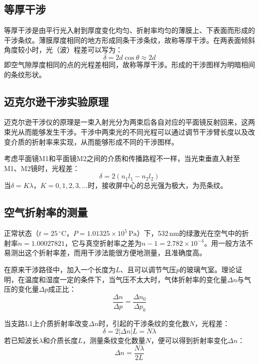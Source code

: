 \documentclass[UTF8]{article}
\begin{document}
\subsection{等厚干涉}

等厚干涉是由平行光入射到厚度变化均匀、折射率均匀的薄膜上、下表面而形成的干涉条纹。薄膜厚度相同的地方形成同条干涉条纹，故称等厚干涉。在两表面倾斜角度较小时，光（波）程差可以写为：
\begin{equation}
    \delta = 2d\cos\theta \approx 2d
    \label{eq:equal-thick}
\end{equation}
即空气隙厚度相同的点的光程差相同，故称等厚干涉。形成的干涉图样为明暗相间的条纹形状。

\subsection{迈克尔逊干涉实验原理}

迈克尔逊干涉仪的原理是一束入射光分为两束后各自对应的平面镜反射回来，这两束光从而能够发生干涉。干涉中两束光的不同光程可以通过调节干涉臂长度以及改变介质的折射率来实现，从而能够形成不同的干涉图样。

考虑平面镜M1和平面镜M2之间的介质和传播路程不一样，当光束垂直入射至M1、M2镜时，光程差：
\begin{equation}
    \delta = 2(n_1 l_1 - n_2 l_2)
    \label{eq:michelson-opd}
\end{equation}
当$\delta = K\lambda$，$K=0,1,2,3,\ldots$时，接收屏中心的总光强为极大，为亮条纹。

\subsection{空气折射率的测量}

正常状态（$t=25\,^{\circ}\mathrm{C}$，$P=1.01325\times10^5\,\mathrm{Pa}$）下，532\,nm的绿激光在空气中的折射率$n=1.00027821$，它与真空折射率之差为$n-1=2.782\times10^{-4}$。用一般方法不易测出这个折射率差，而用干涉法能很方便地测量，且准确度高。

在原来干涉路径中，加入一个长度为$L$、且可以调节气压$p$的玻璃气室。理论证明，在温度和湿度一定的条件下，当气压不太大时，气体折射率的变化量$\Delta n$与气压的变化量$\Delta p$成正比：
\begin{equation}
    \frac{\Delta n}{\Delta p} = \frac{\Delta n_0}{\Delta p_0}
    \label{eq:n-p-ratio}
\end{equation}

当支路L1上介质折射率改变$\Delta n$时，引起的干涉条纹的变化数$N$，光程差：
\begin{equation}
    \delta = 2|\Delta n| L = N\lambda
    \label{eq:fringe-count}
\end{equation}
若已知波长$\lambda$和介质长度$L$，测量条纹变化数量$N$，便可以得到折射率变化$\Delta n$：
\begin{equation}
    \Delta n = \frac{N\lambda}{2L}
    \label{eq:delta-n}
\end{equation}
\end{document}
